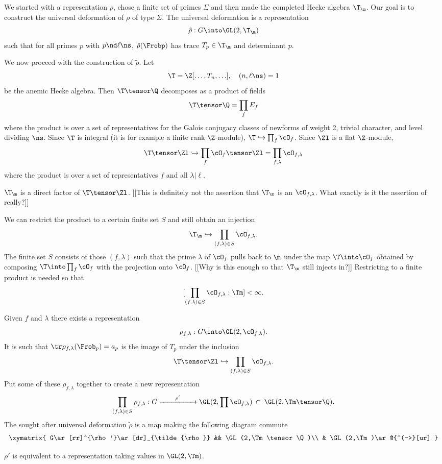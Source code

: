 \documentclass{report}
\begin{document}
We started with a representation $\rho$, chose a finite set of primes
$\Sigma$ and then made the completed Hecke algebra $\T_{\m}$. Our goal
is to construct the universal deformation of $\rho$ of type $\Sigma$.
The universal deformation is a representation
$$\tilde{\rho}:G\into\GL(2,\T_{\m})$$
such that for all primes $p$ with $p\nd\ell\ns$,
$\tilde{\rho}(\Frobp)$ has trace $T_p\in\T_{\m}$ and determinant $p$.

We now proceed with the construction of $\tilde{\rho}$.
Let $$\T=\Z[\ldots,T_n,\ldots], \quad (n,\ell\ns)=1$$
be the anemic Hecke algebra. Then $\T\tensor\Q$ decomposes as
a product of fields
$$\T\tensor\Q=\prod_{f} E_f$$
where the product is over a set of representatives for the Galois
conjugacy classes of newforms of weight 2,
trivial character, and
level dividing $\ns$. Since $\T$ is integral (it is for example a finite
rank $\Z$-module), $\T\hookrightarrow\prod_{f}\cO_{f}$.
Since $\Zl$ is a flat $\Z$-module,
$$\T\tensor\Zl\hookrightarrow \prod_{f}\cO_f\tensor\Zl
=\prod_{f,\lambda}\cO_{f,\lambda}$$
where the product is over a set of representatives $f$
and all $\lambda|\ell$.

$\T_{\m}$ is a direct factor of $\T\tensor\Zl$.
[[This is definitely not the assertion that $\T_{\m}$ is an
$\cO_{f,\lambda}$. What exactly is it the assertion of really?]]

We can restrict the product to a certain finite set
$S$ and still obtain an injection
$$\T_{\m}\hookrightarrow \prod_{(f,\lambda)\in S} \cO_{f,\lambda}.$$
The finite set $S$ consists of those $(f,\lambda)$ such that
the prime $\lambda$ of $\cO_f$ pulls back to $\m$ under
the map $\T\into\cO_f$ obtained by composing
$\T\into\prod_f\cO_f$ with the projection onto $\cO_f$.
[[Why is this enough so that $\T_{\m}$ still injects in?]]
Restricting to a finite product is needed so that
$$[\prod_{(f,\lambda)\in S}\cO_{f,\lambda}:\Tm]<\infty.$$

Given $f$ and $\lambda$ there exists a representation
$$\rho_{f,\lambda}:G\into\GL(2,\cO_{f,\lambda}).$$
It is such that
$\tr \rho_{f,\lambda}(\Frob_p)=a_p$ is
the image of $T_p$ under the inclusion
$$\T\tensor\Zl\hookrightarrow\prod_{(f,\lambda)\in S}\cO_{f,\lambda}.$$
Put some of these $\rho_{f,\lambda}$ together to create
a new representation
$$\prod_{(f,\lambda)\in S}\rho_{f,\lambda}:
           G\xrightarrow{\qquad\rho'\qquad}\GL(2,\prod\cO_{f,\lambda})
                  \,\subset\, \GL(2,\Tm\tensor\Q).$$
The sought after universal
deformation $\tilde{\rho}$ is a map making
the following diagram commute
$$\xymatrix{
   G\ar[rr]^{\rho'}\ar[dr]_{\tilde{\rho}} && \GL(2,\Tm\tensor\Q)\\
                       & \GL(2,\Tm)\ar@{^(->}[ur]
}$$
\begin{theorem}
   $\rho'$ is equivalent to a representation taking values
   in $\GL(2,\Tm)$.
\end{theorem}
\end{document}
